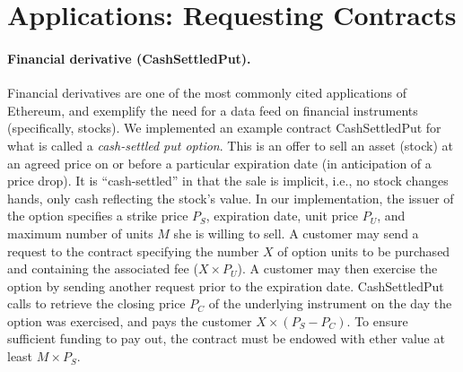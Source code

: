 \section{Applications: Requesting Contracts}

\paragraph{Financial derivative ({\sf CashSettledPut}).} Financial derivatives are one of the most commonly cited applications of Ethereum, and exemplify the need for a data feed on financial instruments (specifically, stocks). We implemented an example contract {\sf CashSettledPut} for what is called a {\em cash-settled put option}. This is an offer to sell an asset (stock) at an agreed price on or before a particular expiration date (in anticipation of a price drop). It is ``cash-settled'' in that the sale is implicit, i.e., no stock changes hands, only cash reflecting the stock's value. In our implementation, the issuer of the option specifies a strike price $P_S$, expiration date, unit price $P_U$, and maximum number of units $M$ she is willing to sell. A customer may send a request to the contract specifying the number $X$ of option units to be purchased and containing the associated fee ($X \times P_U$). A customer may then exercise the option by sending another request prior to the expiration date. {\sf CashSettledPut} calls \tc to retrieve the closing price $P_C$ of the underlying instrument on the day the option was exercised, and pays the customer $X \times (P_S - P_C)$. To ensure sufficient funding to pay out, the contract must be endowed with ether value at least $M \times P_S$.

\iffalse
\paragraph{Financial Derivatives.}  In order to implement a financial derivative as a smart contract, we require information about the corresponding financial instrument upon which the derivative depends (typically a stock).  As an example, we implemented a cash-settled put option.  The issuer of the option creates a contract for a particular stock, strike price, time period, unit price, and the maximum number of units he is willing to sell.  Customers may purchase the option by sending requests to the contract along with the associated fee indicating the number of units of the option they would like to buy.  Until the expiration date, customers may choose to exercise the put option by making another request to the option contract.  The contract then requests that TC retrieve the closing price of the underlying instrument on the day the option was exercised, and pays out to the customer the difference between the strike price and the closing price for each unit of the option purchased.  To ensure the contract always has sufficient funds to pay out, it must control value of at least the strike price times the maximum number of units sold.
\fi

